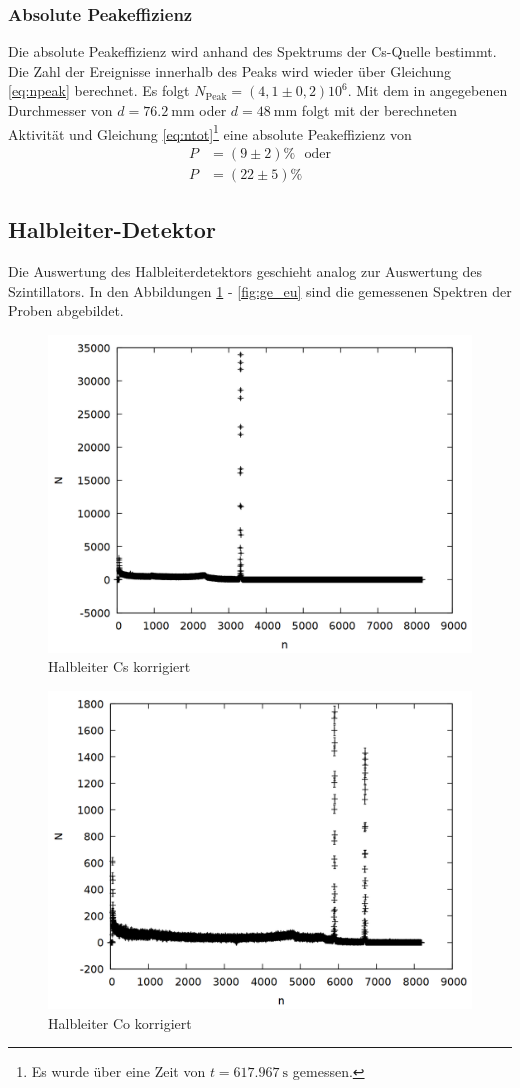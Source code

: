 \subsubsection*{Absolute Peakeffizienz}
Die absolute Peakeffizienz wird anhand des Spektrums der Cs-Quelle bestimmt. Die Zahl der Ereignisse innerhalb des Peaks wird wieder über Gleichung \ref{eq:npeak} berechnet. Es folgt $N_\mathrm{Peak}=(4,1 \pm 0,2)10^6$. Mit dem in \cite{praktikumsheft} angegebenen Durchmesser von $d=\SI{76.2}{\milli\metre}$ oder $d=\SI{48}{\milli\metre}$ folgt mit der berechneten Aktivität und Gleichung \ref{eq:ntot}\footnote{Es wurde über eine Zeit von $t=\SI{617.967}{\second}$ gemessen.} eine absolute Peakeffizienz von
\begin{align*}
  P&=(9 \pm 2)\% \ \ \ \mathrm{oder}\\
  P&=(22 \pm 5)\%
\end{align*}

\subsection{Halbleiter-Detektor}
Die Auswertung des Halbleiterdetektors geschieht analog zur Auswertung des Szintillators. In den Abbildungen \ref{fig:ge_cs} - \ref{fig:ge_eu} sind die gemessenen Spektren der Proben abgebildet. 

\begin{figure}[h]
\centering
\includegraphics[width=0.7\linewidth]{data/ge_cs.png}
\caption{Halbleiter Cs korrigiert}
\label{fig:ge_cs}
\end{figure}

\newpage

\begin{figure}[h]
\centering
\includegraphics[width=0.7\linewidth]{data/ge_co.png}
\caption{Halbleiter Co korrigiert}
\label{fig:ge_co}
\end{figure}

